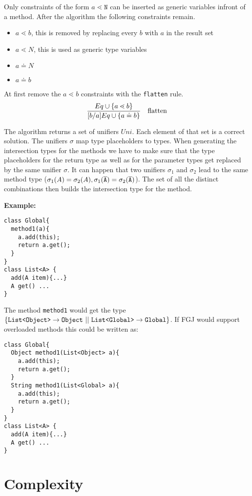 \documentclass[a4paper,USenglish,cleveref, autoref, thm-restate]{lipics-v2021}
\begin{document}
Only constraints of the form $a \lessdot \texttt{N}$ can be inserted as generic variables infront of a method.
After the \unify algorithm the following constraints remain.
\begin{itemize}
  \item $a \lessdot b$, this is removed by replacing every $b$ with $a$ in the result set
  \item $a \lessdot N$, this is used as generic type variables
  \item $a \doteq N$
  \item $a \doteq b$
\end{itemize}

At first remove the $a \lessdot b$ constraints with the \texttt{flatten} rule.
\begin{align*}
  \frac{\displaystyle 
    Eq \cup \{  a \lessdot b \}
  }{\displaystyle 
    [b/a]Eq \cup \{  a \doteq b  \}
  }
  \quad \text{flatten}
\end{align*}


The \unify algorithm returns a set of unifiers ${Uni}$.
Each element of that set is a correct solution.
The unifiers $\sigma$ map type placeholders to types.
When generating the intersection types for the methods we have to make sure that the
type placeholders for the return type as well as for the parameter types get replaced by the same unifier $\sigma$.
It can happen that two unifiers $\sigma_1$ and $\sigma_2$ lead to the same method type ($\sigma_1(A) = \sigma_2(A), \sigma_1(\overline{\tt A}) = \sigma_2(\overline{\tt A})$).
The set of all the distinct combinations then builds the intersection type for the method.

\textbf{Example:}
\begin{lstlisting}
class Global{
  method1(a){
    a.add(this);
    return a.get();
  }
}
class List<A> {
  add(A item){...}
  A get() ...
}
\end{lstlisting}

The method \texttt{method1} would get the type $\{  \mathtt{List \texttt{<} Object \texttt{>} } \to \texttt{Object}
\ || \ \mathtt{List \texttt{<} Global \texttt{>} } \to \texttt{Global} \}$.
If FGJ would support overloaded methods this could be written as:
\begin{lstlisting}
class Global{
  Object method1(List<Object> a){
    a.add(this);
    return a.get();
  }
  String method1(List<Global> a){
    a.add(this);
    return a.get();
  }
}
class List<A> {
  add(A item){...}
  A get() ...
}
\end{lstlisting}

\section{Complexity}
\label{sec:complexity}
\end{document}
